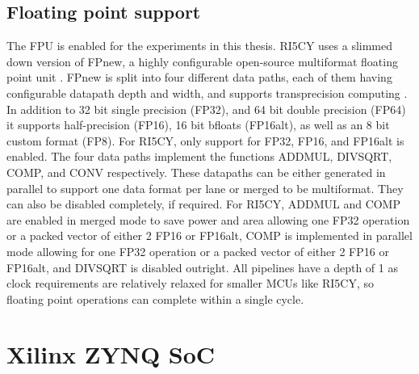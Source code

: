 \documentclass[../bachelor_paper.tex]{subfiles}
\begin{document}
\subsection{Floating point support}
    \label{sub:plat/ip/fpu}
The \ac{FPU} is enabled for the experiments in this thesis. RI5CY uses a slimmed down version of FPnew, a highly configurable open-source multiformat floating point unit \cite{machFPnewOpenSourceMultiformat2021}. FPnew is split into four different data paths, each of them having configurable datapath depth and width, and supports transprecision computing \cite{malossiTransprecisionComputingParadigm2018}. In addition to 32 bit single precision (FP32), and 64 bit double precision (FP64) it supports half-precision (FP16), 16 bit bfloats (FP16alt), as well as an 8 bit custom format (FP8). For RI5CY, only support for FP32, FP16, and FP16alt is enabled. The four data paths implement the functions \ac{ADDMUL}, \ac{DIVSQRT}, \ac{COMP}, and \ac{CONV} respectively. These datapaths can be either generated in parallel to support one data format per lane or merged to be multiformat. They can also be disabled completely, if required. For RI5CY, \ac{ADDMUL} and \ac{COMP} are enabled in merged mode to save power and area allowing one FP32 operation or a packed vector of either 2 FP16 or FP16alt, \ac{COMP} is implemented in parallel mode allowing for one FP32 operation or a packed vector of either 2 FP16 or FP16alt, and \ac{DIVSQRT} is disabled outright. All pipelines have a depth of 1 as clock requirements are relatively relaxed for smaller \acp{MCU} like RI5CY, so floating point operations can complete within a single cycle. 

\section{Xilinx ZYNQ SoC}


\isstandalone



\fi
\end{document}
